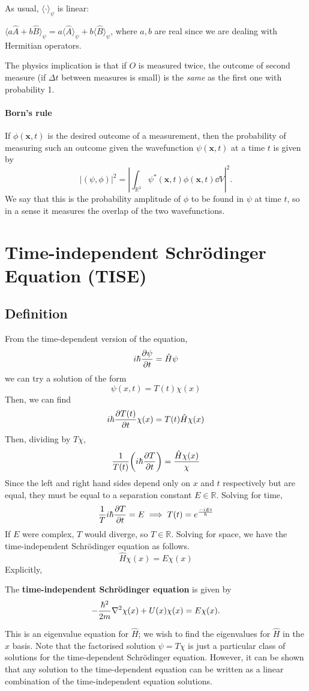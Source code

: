 \documentclass[a4paper]{article}
\begin{document}
As usual, $ \langle \cdot \rangle_{\psi} $ is linear: 
\begin{proposition}
    $ \langle a \hat{A}+ b\hat B \rangle_{\psi} = a \langle \hat A\rangle _{\psi} + b \langle\hat B\rangle_{\psi} $, where $a,b$ are real since we are dealing with Hermitian operators.
\end{proposition}

The physics implication is that if $O$ is measured twice, the outcome of second measure (if $\Delta t$ between measures is small) is the \textit{same} as the first one with probability 1. 

\paragraph{Born's rule} If $\phi(\mathbf{x}, t)$ is the desired outcome of a measurement, then the probability of measuring such an outcome given the wavefunction $\psi(\mathbf{x}, t)$ at a time $t$ is given by
\[
|(\psi, \phi)|^2=\left|\int_{\mathbb{R}^3} \psi^*(\mathbf{x}, t) \phi(\mathbf{x}, t) \dd V\right|^2 .
\]
We say that this is the probability amplitude of $\phi$ to be found in $\psi$ at time $t$, so in a sense it measures the overlap of the two wavefunctions.

\section{Time-independent Schr\"odinger Equation (TISE)}
\subsection{Definition}
From the time-dependent version of the equation,
\[
	i\hbar \pdv{\psi}{t} = \hat H \psi
\]
we can try a solution of the form
\[
	\psi(x,t) = T(t) \chi(x)
\]
Then, we can find
\[
	i \hbar \pdv{T(t)}{t} \chi(x) = T(t) \hat H \chi(x)
\]
Then, dividing by \( T \chi \),
\[
	\frac{1}{T(t)} \qty(i \hbar \pdv{T}{t}) = \frac{\hat H \chi(x)}{\chi}
\]
Since the left and right hand sides depend only on \( x \) and \( t \) respectively but are equal, they must be equal to a separation constant \( E \in \mathbb R \).
Solving for time,
\[
	\frac{1}{T} i \hbar \pdv{T}{t} = E \implies T(t) = e^{\frac{-i Et}{\hbar}}
\]
If \( E \) were complex, \( T \) would diverge, so $T\in \mathbb{R}$.
Solving for space, we have the time-independent Schr\"odinger equation as follows.
\[
	\hat H \chi(x) = E \chi(x)
\]
Explicitly,
\begin{definition}
    The \textbf{time-independent Schr\"odinger equation} is given by 
    \[
	-\frac{\hbar^2}{2m} \laplacian{\chi(x)} + U(x) \chi(x) = E \chi(x).
\]
\end{definition}
This is an eigenvalue equation for \( \hat H \); we wish to find the eigenvalues for \( \hat H \) in the \( x \) basis.
Note that the factorised solution \( \psi = T \chi \) is just a particular class of solutions for the time-dependent Schr\"odinger equation.
However, it can be shown that any solution to the time-dependent equation can be written as a linear combination of the time-independent equation solutions.
\end{document}
